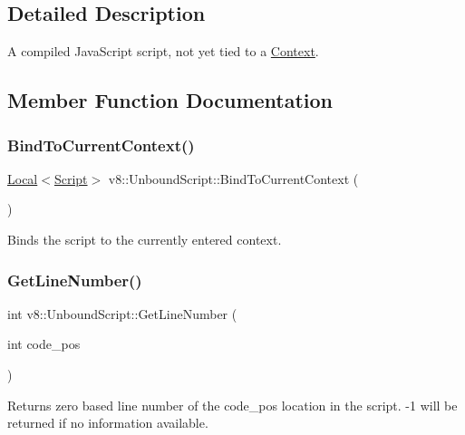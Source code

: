 \subsection{Detailed Description}
A compiled Java\+Script script, not yet tied to a \mbox{\hyperlink{classv8_1_1Context}{Context}}. 

\subsection{Member Function Documentation}
\mbox{\label{classv8_1_1UnboundScript_a0f3354dc71e3f831d10f6e82704a4c2b}} 
\subsubsection{\texorpdfstring{Bind\+To\+Current\+Context()}{BindToCurrentContext()}}
{\footnotesize\ttfamily \mbox{\hyperlink{classv8_1_1Local}{Local}}$<$\mbox{\hyperlink{classv8_1_1Script}{Script}}$>$ v8\+::\+Unbound\+Script\+::\+Bind\+To\+Current\+Context (\begin{DoxyParamCaption}{ }\end{DoxyParamCaption})}

Binds the script to the currently entered context. \mbox{\label{classv8_1_1UnboundScript_a020ca8bbe6ea2313aeedc993ccac3741}} 
\subsubsection{\texorpdfstring{Get\+Line\+Number()}{GetLineNumber()}}
{\footnotesize\ttfamily int v8\+::\+Unbound\+Script\+::\+Get\+Line\+Number (\begin{DoxyParamCaption}\item[{int}]{code\+\_\+pos }\end{DoxyParamCaption})}

Returns zero based line number of the code\+\_\+pos location in the script. -\/1 will be returned if no information available. \mbox{\label{classv8_1_1UnboundScript_ae237f900eb0821e4121f45de4151c7e8}} 
